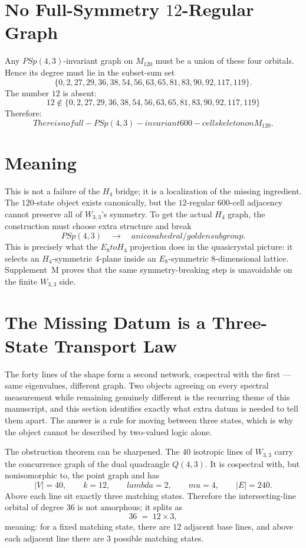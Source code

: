 \documentclass[12pt,a4paper]{article}
\def\mathrm#1{#1}%
\def\mathcal#1{#1}%
\def\text#1{#1}%
\def\lambda{lambda}%
\def\mu{mu}%
\def\to{ to }%
\theoremstyle{definition}
\newcommand{\PSp}{\mathrm{PSp}}
\begin{document}
\section*{No Full-Symmetry $12$-Regular Graph}

Any $\PSp(4,3)$-invariant graph on $\mathcal{M}_{120}$ must be a union
of these four orbitals.  Hence its degree must lie in the subset-sum set
\[
\{0,2,27,29,36,38,54,56,63,65,81,83,90,92,117,119\}.
\]
The number $12$ is absent:
\[
\boxed{\;12\notin
\{0,2,27,29,36,38,54,56,63,65,81,83,90,92,117,119\}\;}
\]
Therefore:
\[
\boxed{\;\text{There is no full-}\PSp(4,3)\text{-invariant }600\text{-cell skeleton on }\mathcal{M}_{120}.\;}
\]

\section*{Meaning}

This is not a failure of the $H_4$ bridge; it is a localization of the
missing ingredient.  The $120$-state object exists canonically, but the
$12$-regular $600$-cell adjacency cannot preserve all of $W_{3,3}$'s
symmetry.  To get the actual $H_4$ graph, the construction must choose
extra structure and break
\[
\PSp(4,3)\quad\longrightarrow\quad \text{an icosahedral/golden subgroup}.
\]
This is precisely what the $E_8\to H_4$ projection does in the
quasicrystal picture: it selects an $H_4$-symmetric $4$-plane inside an
$E_8$-symmetric $8$-dimensional lattice.  Supplement~M proves that the
same symmetry-breaking step is unavoidable on the finite $W_{3,3}$ side.

\section*{The Missing Datum is a Three-State Transport Law}

\begin{plainbox}
The forty lines of the shape form a second network, cospectral with the first ---
same eigenvalues, different graph. Two objects agreeing on every spectral measurement while
remaining genuinely different is the recurring theme of this manuscript, and this section
identifies exactly what extra datum is needed to tell them apart. The answer is a rule for
moving between three states, which is why the object cannot be described by two-valued
logic alone.
\end{plainbox}


The obstruction theorem can be sharpened.  The $40$ isotropic lines of
$W_{3,3}$ carry the concurrence graph of the dual quadrangle $Q(4,3)$.
It is cospectral with, but nonisomorphic to, the point graph and has
\[
|V|=40,\qquad k=12,\qquad \lambda=2,\qquad \mu=4,\qquad |E|=240.
\]
Above each line sit exactly three matching states.  Therefore the
intersecting-line orbital of degree $36$ is not amorphous; it splits as
\[
36 \;=\; 12\times 3,
\]
meaning: for a fixed matching state, there are $12$ adjacent base lines,
and above each adjacent line there are $3$ possible matching states.
\end{document}
